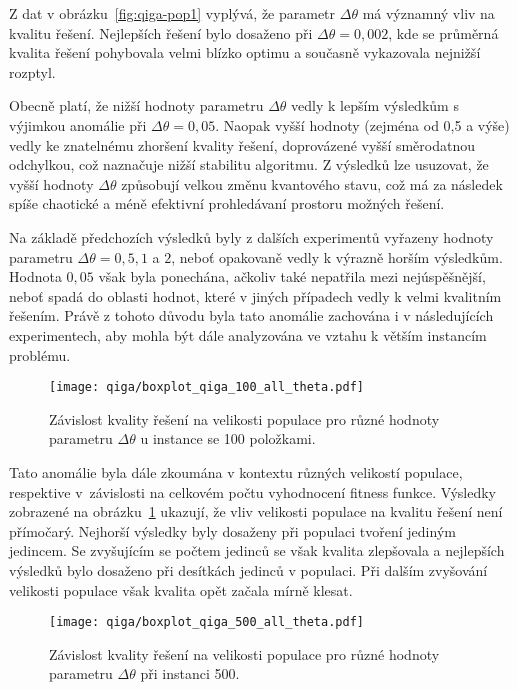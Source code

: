 Z dat v obrázku~\ref{fig:qiga-pop1} vyplývá, že parametr $\Delta\theta$ má významný vliv na kvalitu řešení. 
Nejlepších řešení bylo dosaženo při $\Delta\theta = 0,002$, kde se průměrná kvalita řešení pohybovala velmi blízko optimu a současně vykazovala nejnižší rozptyl. 

Obecně platí, že nižší hodnoty parametru $\Delta\theta$ vedly k lepším výsledkům s výjimkou anomálie při $\Delta\theta = 0,05$. 
Naopak vyšší hodnoty (zejména od 0,5 a výše) vedly ke znatelnému zhoršení kvality řešení, doprovázené vyšší směrodatnou odchylkou, což naznačuje nižší stabilitu algoritmu. 
Z výsledků lze usuzovat, že vyšší hodnoty $\Delta\theta$ způsobují velkou změnu kvantového stavu, což má za následek spíše chaotické a méně efektivní prohledávaní prostoru možných řešení. 

Na základě předchozích výsledků byly z dalších experimentů vyřazeny hodnoty parametru $\Delta\theta = 0,5, 1$ a $2$, neboť opakovaně vedly k výrazně horším výsledkům. 
Hodnota $0,05$ však byla ponechána, ačkoliv také nepatřila mezi nejúspěšnější, neboť spadá do oblasti hodnot, které v jiných případech vedly k velmi kvalitním řešením. 
Právě z tohoto důvodu byla tato anomálie zachována i v následujících experimentech, aby mohla být dále analyzována ve vztahu k větším instancím problému. 

\begin{figure}[h!]
    \centering
    \texttt{[image: qiga/boxplot\_qiga\_100\_all\_theta.pdf]}
    \caption{Závislost kvality řešení na velikosti populace pro různé hodnoty parametru $\Delta\theta$ u instance se 100 položkami.}
    \label{fig:qiga-100-all}
\end{figure}

Tato anomálie byla dále zkoumána v kontextu různých velikostí populace, respektive v~závislosti na celkovém počtu vyhodnocení fitness funkce. 
Výsledky zobrazené na obrázku~\ref{fig:qiga-100-all} ukazují, že vliv velikosti populace na kvalitu řešení není přímočarý. 
Nejhorší výsledky byly dosaženy při populaci tvoření jediným jedincem. 
Se zvyšujícím se počtem jedinců se však kvalita zlepšovala a nejlepších výsledků bylo dosaženo při desítkách jedinců v populaci. 
Při dalším zvyšování velikosti populace však kvalita opět začala mírně klesat.

\begin{figure}[h!]
    \centering
    \texttt{[image: qiga/boxplot\_qiga\_500\_all\_theta.pdf]}
    \caption{Závislost kvality řešení na velikosti populace pro různé hodnoty parametru $\Delta\theta$ při instanci 500.}
    \label{fig:qiga-500-all}
\end{figure}

